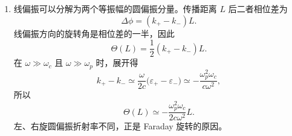 \begin{question}
\begin{solution}
\begin{enumerate}
  \item 线偏振可以分解为两个等振幅的圆偏振分量。传播距离 $L$ 后二者相位差为
  \[
    \Delta\phi=(k_+-k_-)L .
  \]
  线偏振方向的旋转角是相位差的一半，因此
  \[
    \boxed{\Theta(L)=\frac12(k_+-k_-)L} .
  \]
  在 $\omega\gg\omega_c$ 且 $\omega\gg\omega_p$ 时，展开得
  \[
    k_+-k_-\simeq \frac{\omega}{2c}\bigl(\varepsilon_+-\varepsilon_-\bigr)
    \simeq -\frac{\omega_p^2\omega_c}{c\omega^2},
  \]
  所以
  \[
    \Theta(L)\simeq -\frac{\omega_p^2\omega_c}{2c\omega^2}L .
  \]
  左、右旋圆偏振折射率不同，正是 Faraday 旋转的原因。
\end{enumerate}
\end{solution}
\end{question}
